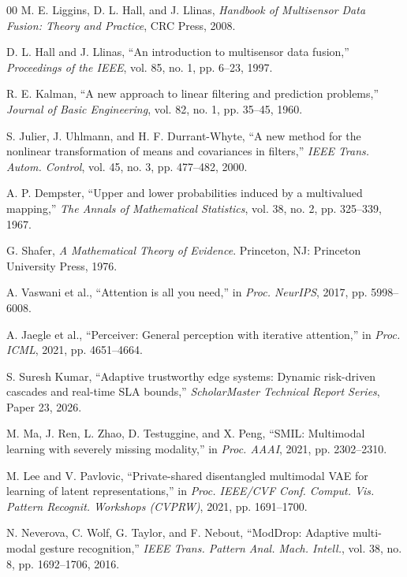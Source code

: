 \documentclass[conference]{IEEEtran}
\begin{document}
\begin{thebibliography}{00}
 M. E. Liggins, D. L. Hall, and J. Llinas, \emph{Handbook of Multisensor Data Fusion: Theory and Practice}, CRC Press, 2008.

 D. L. Hall and J. Llinas, ``An introduction to multisensor data fusion,'' \emph{Proceedings of the IEEE}, vol. 85, no. 1, pp. 6--23, 1997.

 R. E. Kalman, ``A new approach to linear filtering and prediction problems,'' \emph{Journal of Basic Engineering}, vol. 82, no. 1, pp. 35--45, 1960.

 S. Julier, J. Uhlmann, and H. F. Durrant-Whyte, ``A new method for the nonlinear transformation of means and covariances in filters,'' \emph{IEEE Trans. Autom. Control}, vol. 45, no. 3, pp. 477--482, 2000.

 A. P. Dempster, ``Upper and lower probabilities induced by a multivalued mapping,'' \emph{The Annals of Mathematical Statistics}, vol. 38, no. 2, pp. 325--339, 1967.

 G. Shafer, \emph{A Mathematical Theory of Evidence}. Princeton, NJ: Princeton University Press, 1976.

 A. Vaswani et al., ``Attention is all you need,'' in \emph{Proc. NeurIPS}, 2017, pp. 5998--6008.

 A. Jaegle et al., ``Perceiver: General perception with iterative attention,'' in \emph{Proc. ICML}, 2021, pp. 4651--4664.

 S. Suresh Kumar, ``Adaptive trustworthy edge systems: Dynamic risk-driven cascades and real-time SLA bounds,'' \emph{ScholarMaster Technical Report Series}, Paper 23, 2026.

 M. Ma, J. Ren, L. Zhao, D. Testuggine, and X. Peng, ``SMIL: Multimodal learning with severely missing modality,'' in \emph{Proc. AAAI}, 2021, pp. 2302--2310.

 M. Lee and V. Pavlovic, ``Private-shared disentangled multimodal VAE for learning of latent representations,'' in \emph{Proc. IEEE/CVF Conf. Comput. Vis. Pattern Recognit. Workshops (CVPRW)}, 2021, pp. 1691--1700.

 N. Neverova, C. Wolf, G. Taylor, and F. Nebout, ``ModDrop: Adaptive multi-modal gesture recognition,'' \emph{IEEE Trans. Pattern Anal. Mach. Intell.}, vol. 38, no. 8, pp. 1692--1706, 2016.


\end{thebibliography}
\end{document}
